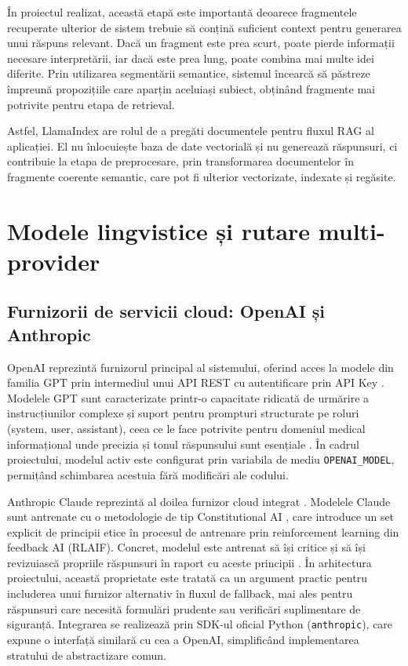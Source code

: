 \documentclass[12pt, a4paper, oneside, romanian]{teza-upb}
\begin{document}
În proiectul realizat, această etapă este importantă deoarece fragmentele recuperate ulterior de sistem trebuie să conțină suficient context pentru generarea unui răspuns relevant. Dacă un fragment este prea scurt, poate pierde informații necesare interpretării, iar dacă este prea lung, poate combina mai multe idei diferite. Prin utilizarea segmentării semantice, sistemul încearcă să păstreze împreună propozițiile care aparțin aceluiași subiect, obținând fragmente mai potrivite pentru etapa de retrieval.

Astfel, LlamaIndex are rolul de a pregăti documentele pentru fluxul RAG al aplicației. El nu înlocuiește baza de date vectorială și nu generează răspunsuri, ci contribuie la etapa de preprocesare, prin transformarea documentelor în fragmente coerente semantic, care pot fi ulterior vectorizate, indexate și regăsite.


\section{Modele lingvistice și rutare multi-provider}


\subsection{Furnizorii de servicii cloud: OpenAI și Anthropic}

OpenAI reprezintă furnizorul principal al sistemului, oferind acces la modele 
din familia GPT prin intermediul unui API REST cu autentificare prin API Key
\cite{openai_api}. Modelele GPT sunt caracterizate printr-o capacitate ridicată 
de urmărire a instrucțiunilor complexe și suport pentru prompturi structurate 
pe roluri (system, user, assistant), ceea ce le face potrivite pentru domeniul 
medical informațional unde precizia și tonul răspunsului sunt esențiale 
\cite{openai_api}. În cadrul proiectului, modelul activ este configurat prin 
variabila de mediu \texttt{OPENAI\_MODEL}, permițând schimbarea acestuia fără 
modificări ale codului.

Anthropic Claude reprezintă al doilea furnizor cloud integrat \cite{anthropic_claude}. 
Modelele Claude sunt antrenate cu o metodologie de tip Constitutional AI 
\cite{bai2022constitutional}, care introduce un set explicit de principii etice 
în procesul de antrenare prin reinforcement learning din feedback AI (RLAIF). 
Concret, modelul este antrenat să își critice și să își revizuiască propriile 
răspunsuri în raport cu aceste principii \cite{bai2022constitutional}. În 
arhitectura proiectului, această proprietate este tratată ca un argument 
practic pentru includerea unui furnizor alternativ în fluxul de fallback, mai 
ales pentru răspunsuri care necesită formulări prudente sau verificări 
suplimentare de siguranță. Integrarea 
se realizează prin SDK-ul oficial Python (\texttt{anthropic}), care expune 
o interfață similară cu cea a OpenAI, simplificând implementarea stratului 
de abstractizare comun.
\end{document}
